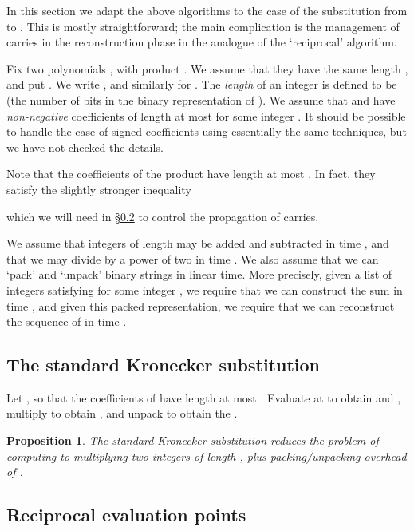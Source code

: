 \documentclass{amsart}
\newtheorem{prop}[thm]{Proposition}
\theoremstyle{definition}
\theoremstyle{remark}
\begin{document}
In this section we adapt the above algorithms to the case of the substitution from  to . This is mostly straightforward; the main complication is the management of carries in the reconstruction phase in the analogue of the `reciprocal' algorithm.

Fix two polynomials , with product . We assume that they have the same length , and put . We write , and similarly for . The \emph{length} of an integer  is defined to be  (the number of bits in the binary representation of ). We assume that  and  have \emph{non-negative} coefficients of length at most  for some integer . It should be possible to handle the case of signed coefficients using essentially the same techniques, but we have not checked the details.

Note that the coefficients of the product  have length at most . In fact, they satisfy the slightly stronger inequality

which we will need in \S\ref{sec:integer-recip} to control the propagation of carries.

We assume that integers of length  may be added and subtracted in time , and that we may divide by a power of two in time . We also assume that we can `pack' and `unpack' binary strings in linear time. More precisely, given a list of integers  satisfying  for some integer , we require that we can construct the sum  in time , and given this packed representation, we require that we can reconstruct the sequence of  in time .

 

\subsection{The standard Kronecker substitution}
\label{sec:integer-std}

Let , so that the coefficients of  have length at most . Evaluate at  to obtain  and , multiply to obtain , and unpack  to obtain the .

\begin{prop}
The standard Kronecker substitution reduces the problem of computing  to multiplying two integers of length , plus packing/unpacking overhead of .
\end{prop}


\subsection{Reciprocal evaluation points}
\label{sec:integer-recip}
\end{document}
